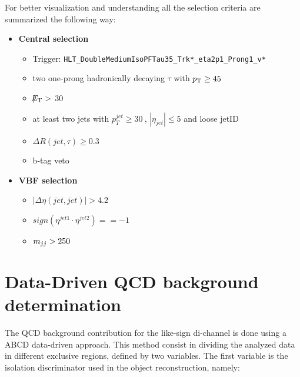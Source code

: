 For better visualization and understanding all the selection criteria are summarized the following way:


\begin{itemize}
	\item \textbf{Central selection}
	\begin{itemize}
		\item Trigger: \texttt{HLT\_DoubleMediumIsoPFTau35\_Trk*\_eta2p1\_Prong1\_v*}
		\item two one-prong hadronically decaying $\tau$ with $p_{\text{T}}\geq45~$\gev 
		\item $\slash\mkern-12mu{E}_{\text{T}} > $ 30
		\item at least two jets with $p_{T}^{jet}\geq30~$\gev, $|\eta_{jet}|\leq5$ and loose jetID
		\item $\Delta R(jet,\tau)\geq0.3$
		\item b-tag veto
	\end{itemize}
	\item \textbf{VBF selection}
	\begin{itemize}
		\item $|\Delta\eta(jet,jet)| > 4.2$
		\item $sign(\eta^{jet 1}\cdot\eta^{jet 2})==-1$
		\item $m_{jj}>250~$\gev
	\end{itemize}
\end{itemize}


\clearpage



\section {Data-Driven QCD background determination} \label{sec:bgestimation}


The QCD background contribution for the like-sign di-\hadtau channel is done using a ABCD data-driven approach. This method consist in dividing the analyzed data in different exclusive regions, defined by two variables. The first variable is the \hadtau isolation discriminator used in the object reconstruction, namely:
 	
